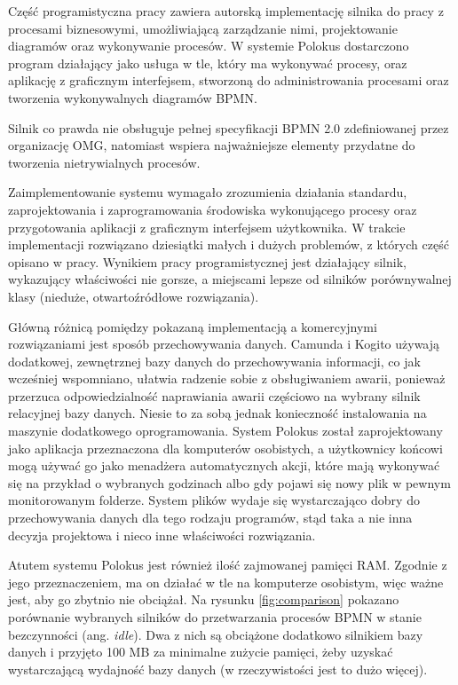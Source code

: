 \documentclass[declaration,shortabstract,mgr]{iithesis}
\newcommand{\bpmn}{BPMN }
\newcommand{\bpmnnospace}{BPMN}
\begin{document}
Część programistyczna pracy zawiera autorską implementację silnika do pracy z procesami biznesowymi, umożliwiającą zarządzanie nimi, projektowanie diagramów oraz wykonywanie procesów. W systemie Polokus dostarczono program działający jako usługa w tle, który ma wykonywać procesy, oraz aplikację z graficznym interfejsem, stworzoną do administrowania procesami oraz tworzenia wykonywalnych diagramów \bpmnnospace. 

Silnik co prawda nie obsługuje pełnej specyfikacji \bpmn 2.0 zdefiniowanej przez organizację OMG, natomiast wspiera najważniejsze elementy przydatne do tworzenia nietrywialnych procesów.

Zaimplementowanie systemu wymagało zrozumienia działania standardu, zaprojektowania i zaprogramowania środowiska wykonującego procesy oraz przygotowania aplikacji z graficznym interfejsem użytkownika. W trakcie implementacji rozwiązano dziesiątki małych i dużych problemów, z których część opisano w pracy. Wynikiem pracy programistycznej jest działający silnik, wykazujący właściwości nie gorsze, a miejscami lepsze od silników porównywalnej klasy (nieduże, otwartoźródłowe rozwiązania).

Główną różnicą pomiędzy pokazaną implementacją a komercyjnymi rozwiązaniami jest sposób przechowywania danych. Camunda i Kogito używają dodatkowej, zewnętrznej bazy danych do przechowywania informacji, co jak wcześniej wspomniano, ułatwia radzenie sobie z obsługiwaniem awarii, ponieważ przerzuca odpowiedzialność naprawiania awarii częściowo na wybrany silnik relacyjnej bazy danych. Niesie to za sobą jednak konieczność instalowania na maszynie dodatkowego oprogramowania. System Polokus został zaprojektowany jako aplikacja przeznaczona dla komputerów osobistych, a użytkownicy końcowi mogą używać go jako menadżera automatycznych akcji, które mają wykonywać się na przykład o wybranych godzinach albo gdy pojawi się nowy plik w pewnym monitorowanym folderze. System plików wydaje się wystarczająco dobry do przechowywania danych dla tego rodzaju programów, stąd taka a nie inna decyzja projektowa i nieco inne właściwości rozwiązania.

Atutem systemu Polokus jest również ilość zajmowanej pamięci RAM. Zgodnie z jego przeznaczeniem, ma on działać w tle na komputerze osobistym, więc ważne jest, aby go zbytnio nie obciążał. Na rysunku \ref{fig:comparison} pokazano porównanie wybranych silników do przetwarzania procesów \bpmn w stanie bezczynności (ang. \textit{idle}). Dwa z nich są obciążone dodatkowo silnikiem bazy danych i przyjęto 100 MB za minimalne zużycie pamięci, żeby uzyskać wystarczającą wydajność bazy danych (w rzeczywistości jest to dużo więcej).
\end{document}
